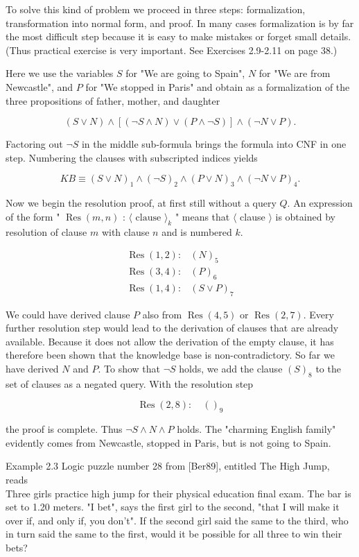 \documentclass[10pt]{article}
\begin{document}
To solve this kind of problem we proceed in three steps: formalization, transformation into normal form, and proof. In many cases formalization is by far the most difficult step because it is easy to make mistakes or forget small details. (Thus practical exercise is very important. See Exercises 2.9-2.11 on page 38.)

Here we use the variables $S$ for "We are going to Spain", $N$ for "We are from Newcastle", and $P$ for "We stopped in Paris" and obtain as a formalization of the three propositions of father, mother, and daughter

$$
(S \vee N) \wedge[(\neg S \wedge N) \vee(P \wedge \neg S)] \wedge(\neg N \vee P) .
$$

Factoring out $\neg S$ in the middle sub-formula brings the formula into CNF in one step. Numbering the clauses with subscripted indices yields

$$
K B \equiv(S \vee N)_{1} \wedge(\neg S)_{2} \wedge(P \vee N)_{3} \wedge(\neg N \vee P)_{4} .
$$

Now we begin the resolution proof, at first still without a query $Q$. An expression of the form " $\operatorname{Res}(m, n)$ : $\langle\text { clause }\rangle_{k}$ " means that $\langle$ clause $\rangle$ is obtained by resolution of clause $m$ with clause $n$ and is numbered $k$.

$$
\begin{array}{ll}
\operatorname{Res}(1,2): & (N)_{5} \\
\operatorname{Res}(3,4): & (P)_{6} \\
\operatorname{Res}(1,4): & (S \vee P)_{7}
\end{array}
$$

We could have derived clause $P$ also from $\operatorname{Res}(4,5)$ or $\operatorname{Res}(2,7)$. Every further resolution step would lead to the derivation of clauses that are already available. Because it does not allow the derivation of the empty clause, it has therefore been shown that the knowledge base is non-contradictory. So far we have derived $N$ and $P$. To show that $\neg S$ holds, we add the clause $(S)_{8}$ to the set of clauses as a negated query. With the resolution step

$$
\operatorname{Res}(2,8): \quad()_{9}
$$

the proof is complete. Thus $\neg S \wedge N \wedge P$ holds. The "charming English family" evidently comes from Newcastle, stopped in Paris, but is not going to Spain.

Example 2.3 Logic puzzle number 28 from [Ber89], entitled The High Jump, reads\\
Three girls practice high jump for their physical education final exam. The bar is set to 1.20 meters. "I bet", says the first girl to the second, "that I will make it over if, and only if, you don't". If the second girl said the same to the third, who in turn said the same to the first, would it be possible for all three to win their bets?
\end{document}
